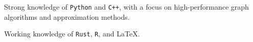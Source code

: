 Strong knowledge of \texttt{Python} and \texttt{C++}\footnotemark, with a focus on high-performance graph algorithms and approximation methods.

Working knowledge of \texttt{Rust}, \texttt{R}, and \LaTeX.

